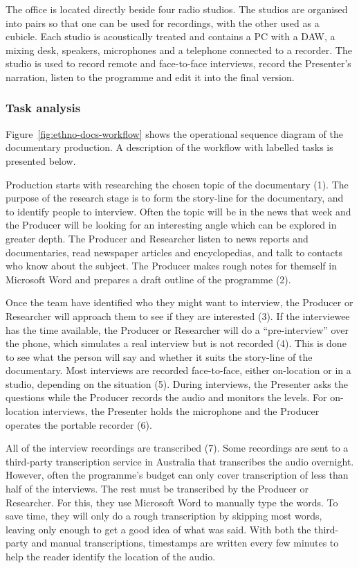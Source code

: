 The office is located directly beside four radio studios. The studios are organised into pairs so that one can be used
for recordings, with the other used as a cubicle. Each studio is acoustically treated and contains a PC with a DAW,
a mixing desk, speakers, microphones and a telephone connected to a recorder. The studio is used to record remote and
face-to-face interviews, record the Presenter's narration, listen to the programme and edit it into the final
version.

\subsubsection{Task analysis}
Figure~\ref{fig:ethno-docs-workflow} shows the operational sequence diagram of the documentary production.  A
description of the workflow with labelled tasks is presented below.

Production starts with researching the chosen topic of the documentary (1).  The purpose of the research stage is to
form the story-line for the documentary, and to identify people to interview.  Often the topic will be in the news that
week and the Producer will be looking for an interesting angle which can be explored in greater depth.  The Producer
and Researcher listen to news reports and documentaries, read newspaper articles and encyclopedias, and talk to
contacts who know about the subject.  The Producer makes rough notes for themself in Microsoft Word and prepares a
draft outline of the programme (2).

Once the team have identified who they might want to interview, the Producer or Researcher will approach them to see if
they are interested (3).  If the interviewee has the time available, the Producer or Researcher will do a
``pre-interview'' over the phone, which simulates a real interview but is not recorded (4). This is done to see what the
person will say and whether it suits the story-line of the documentary.  Most interviews are recorded face-to-face,
either on-location or in a studio, depending on the situation (5).  During interviews, the Presenter asks the questions
while the Producer records the audio and monitors the levels.  For on-location interviews, the Presenter holds the
microphone and the Producer operates the portable recorder (6).

All of the interview recordings are transcribed (7). Some recordings are sent to a third-party transcription service in
Australia that transcribes the audio overnight.  However, often the programme's budget can only cover transcription of
less than half of the interviews. The rest must be transcribed by the Producer or Researcher. For this, they use
Microsoft Word to manually type the words.  To save time, they will only do a rough transcription by skipping most
words, leaving only enough to get a good idea of what was said.  With both the third-party and manual transcriptions,
timestamps are written every few minutes to help the reader identify the location of the audio.

